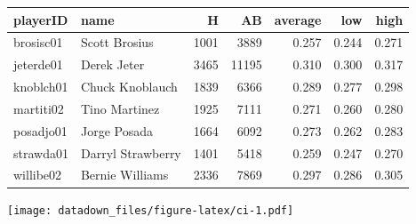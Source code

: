 \documentclass[]{book}
\newenvironment{Shaded}{\begin{snugshade}}{\end{snugshade}}
\newcommand{\CommentTok}[1]{\textcolor[rgb]{0.56,0.35,0.01}{\textit{#1}}}
\newcommand{\DataTypeTok}[1]{\textcolor[rgb]{0.13,0.29,0.53}{#1}}
\newcommand{\DecValTok}[1]{\textcolor[rgb]{0.00,0.00,0.81}{#1}}
\newcommand{\KeywordTok}[1]{\textcolor[rgb]{0.13,0.29,0.53}{\textbf{#1}}}
\newcommand{\NormalTok}[1]{#1}
\newcommand{\OperatorTok}[1]{\textcolor[rgb]{0.81,0.36,0.00}{\textbf{#1}}}
\newcommand{\StringTok}[1]{\textcolor[rgb]{0.31,0.60,0.02}{#1}}
\begin{document}
\begin{tabular}{l|l|r|r|r|r|r}
\hline
playerID & name & H & AB & average & low & high\\
\hline
brosisc01 & Scott Brosius & 1001 & 3889 & 0.257 & 0.244 & 0.271\\
\hline
jeterde01 & Derek Jeter & 3465 & 11195 & 0.310 & 0.300 & 0.317\\
\hline
knoblch01 & Chuck Knoblauch & 1839 & 6366 & 0.289 & 0.277 & 0.298\\
\hline
martiti02 & Tino Martinez & 1925 & 7111 & 0.271 & 0.260 & 0.280\\
\hline
posadjo01 & Jorge Posada & 1664 & 6092 & 0.273 & 0.262 & 0.283\\
\hline
strawda01 & Darryl Strawberry & 1401 & 5418 & 0.259 & 0.247 & 0.270\\
\hline
willibe02 & Bernie Williams & 2336 & 7869 & 0.297 & 0.286 & 0.305\\
\hline
\end{tabular}

\begin{Shaded}
\end{Shaded}

\texttt{[image: datadown\_files/figure-latex/ci-1.pdf]}
\end{document}
